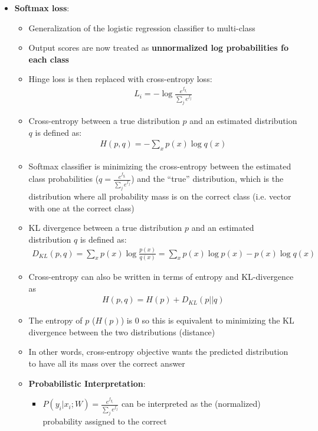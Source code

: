 \documentclass[12pt]{article}
\begin{document}
\begin{itemize}
    \item \textbf{Softmax loss}:
    \begin{itemize}
      \item Generalization of the logistic regression classifier to multi-class
      \item Output scores are now treated as \textbf{unnormalized log probabilities fo each class}
      \item Hinge loss is then replaced with cross-entropy loss:
      \begin{gather*}
        L_i = -\log{\frac{e^{f_{y_i}}}{\sum_j e^{f_{j}}}}
      \end{gather*}
      \item Cross-entropy between a true distribution $p$ and an estimated distribution $q$ is defined as:
      \begin{gather*}
        H(p,q) = -\sum\limits_x p(x)\log{q(x)}
      \end{gather*}
      \item Softmax classifier is minimizing the cross-entropy between the estimated class probabilities
      ($q = \frac{e^{f_{y_i}}}{\sum_je^{f_j}}$) and the ``true'' distribution, which is the distribution where
      all probability mass is on the correct class (i.e. vector with one at the correct class)
      \item KL divergence between a true distribution $p$ and an estimated distribution $q$ is defined as:
      \begin{gather*}
        D_{KL}(p, q) = \sum\limits_x p(x)\log{\frac{p(x)}{q(x)}} = \sum\limits_x p(x)\log{p(x)} - p(x)\log{q(x)}
      \end{gather*}
      \item Cross-entropy can also be written in terms of entropy and KL-divergence as
      \begin{gather*}
        H(p,q) = H(p) + D_{KL}(p || q)
      \end{gather*}
      \item The entropy of $p$ ($H(p)$) is 0 so this is equivalent to minimizing the KL divergence between the two distributions (distance)
      \item In other words, cross-entropy objective wants the predicted distribution to have all its mass over the correct answer
      \item \textbf{Probabilistic Interpretation}:
      \begin{itemize}
        \item $P(y_i | x_i; W) = \frac{e^{f_{y_i}}}{\sum_j e^{f_j}}$ can be interpreted as the (normalized) probability assigned to the correct

\end{itemize}
\end{itemize}
\end{itemize}
\end{document}
